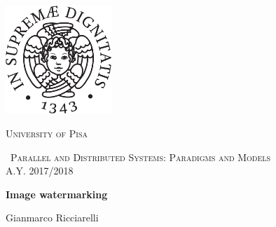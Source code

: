 \begin{titlepage}
  \centering
  \includegraphics[width=0.30\textwidth]{imgs/cherubino_black.pdf}\par\vspace{1cm}
  {\scshape\LARGE University of Pisa \par}
  \vspace{1cm}
  {\scshape\ Parallel and Distributed Systems: Paradigms and Models \\A.Y. 2017/2018\par}
  \vspace{1.5cm}
  {\huge\bfseries Image watermarking\par}
  \vspace{2cm}
  {\Large Gianmarco Ricciarelli \par}
  \vspace{2cm}
  \vfill
\end{titlepage}
